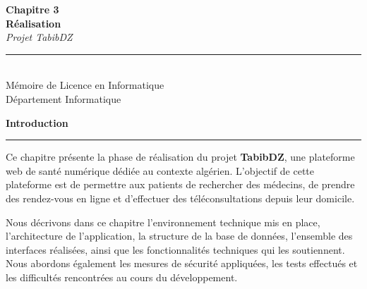 \documentclass[12pt,a4paper]{report}
\begin{document}

\newpage
\thispagestyle{empty}
\vspace*{\fill}

\begin{center}
  {\Huge\bfseries Chapitre 3}\\[0.8cm]
  {\huge\bfseries R\'ealisation}\\[1.2cm]
  {\large\itshape Projet TabibDZ}\\[2cm]
  \rule{0.5\textwidth}{0.4pt}\\[1.2cm]
  {\normalsize M\'emoire de Licence en Informatique}\\[0.3cm]
  {\small D\'epartement Informatique}
\end{center}

\vspace*{\fill}
\newpage

\thispagestyle{empty}
\vspace*{\fill}

\begin{center}
{\Huge\bfseries\color{primaryblue} Introduction}

\vspace{0.3cm}

{\color{primaryblue}\rule{0.5\textwidth}{1.2pt}}
\end{center}

\vspace{0.8cm}


Ce chapitre pr\'esente la phase de r\'ealisation du projet \textbf{TabibDZ}, une plateforme web de sant\'e num\'erique d\'edi\'ee au contexte alg\'erien. L'objectif de cette plateforme est de permettre aux patients de rechercher des m\'edecins, de prendre des rendez-vous en ligne et d'effectuer des t\'el\'econsultations depuis leur domicile.

Nous d\'ecrivons dans ce chapitre l'environnement technique mis en place, l'architecture de l'application, la structure de la base de donn\'ees, l'ensemble des interfaces r\'ealis\'ees, ainsi que les fonctionnalit\'es techniques qui les soutiennent. Nous abordons \'egalement les mesures de s\'ecurit\'e appliqu\'ees, les tests effectu\'es et les difficult\'es rencontr\'ees au cours du d\'eveloppement.
\vspace*{\fill}
\end{document}
